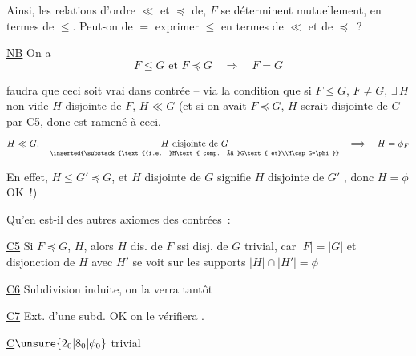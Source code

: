 
Ainsi, les relations d'ordre $\ll$ et $\preceq$ de, $F$ se déterminent mutuellement, en termes de $\leq$. Peut-on de $=$ exprimer $\leq$ en termes de $\ll$ et de $\preceq$~?

\uline{NB} On a
\[
 F\leq G\text{ et }F\preceq G\quad\Longrightarrow\quad F=G
\]

 faudra que ceci soit vrai dans  contrée -- via la condition que si $F\leq G$, $F\ne G$, $\exists\,H$  \uline{non vide} $H$ disjointe de $F$, $H\ll G$ (et si on avait $F\preceq G$, $H$ serait disjointe de $G$ par C5, donc  est ramené à ceci. 
\[
 H\ll G,\quad
 \underset{\inserted{\substack{\text{(i.e. }H\text{ comp. à }G\text{ et}\\H\cap G=\phi}}}{H\text{ disjointe de }G}
 \quad\Longrightarrow\quad H=\phi_{F}
\]

En effet, $H\leq G'\preceq G$,  et $H$ disjointe de $G$ signifie $H$ disjointe de $G'$ , donc $H=\phi$ OK~!)


Qu'en est-il des autres axiomes des contrées~:

\uline{C5} Si $F\preceq G$, $H$, alors $H$ dis. de $F$ ssi disj. de $G$ trivial, car $|F|=|G|$ et disjonction de $H$ avec $H'$ se voit sur les supports  $|H|\cap|H'|=\phi$

\uline{C6} Subdivision induite, on la verra tantôt

\uline{C7} Ext. d'une subd. OK on le vérifiera .

\uline{C}$\unsure{2_0|8_0|\phi_0}$ trivial

